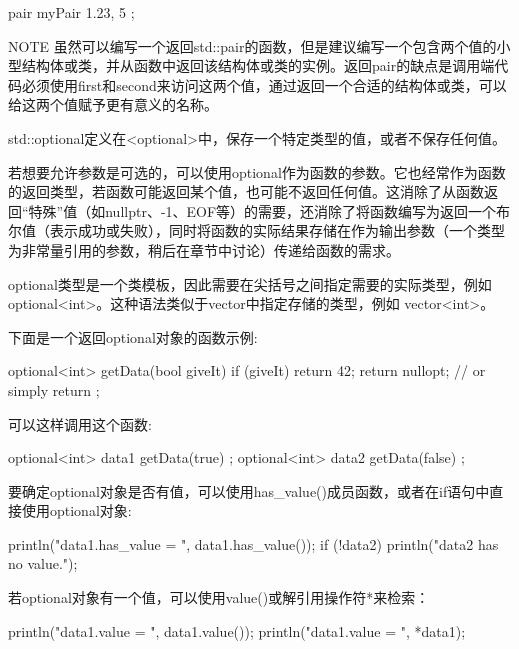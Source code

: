 \begin{cpp}
pair myPair { 1.23, 5 };
\end{cpp}

\begin{myNotic}{NOTE}
虽然可以编写一个返回std::pair的函数，但是建议编写一个包含两个值的小型结构体或类，并从函数中返回该结构体或类的实例。返回pair的缺点是调用端代码必须使用first和second来访问这两个值，通过返回一个合适的结构体或类，可以给这两个值赋予更有意义的名称。
\end{myNotic}


std::optional定义在<optional>中，保存一个特定类型的值，或者不保存任何值。

若想要允许参数是可选的，可以使用optional作为函数的参数。它也经常作为函数的返回类型，若函数可能返回某个值，也可能不返回任何值。这消除了从函数返回“特殊”值（如nullptr、-1、EOF等）的需要，还消除了将函数编写为返回一个布尔值（表示成功或失败），同时将函数的实际结果存储在作为输出参数（一个类型为非常量引用的参数，稍后在章节中讨论）传递给函数的需求。

optional类型是一个类模板，因此需要在尖括号之间指定需要的实际类型，例如 optional<int>。这种语法类似于vector中指定存储的类型，例如 vector<int>。

下面是一个返回optional对象的函数示例:

\begin{cpp}
optional<int> getData(bool giveIt)
{
    if (giveIt) {
        return 42;
    }
    return nullopt; // or simply return {};
}
\end{cpp}

可以这样调用这个函数:

\begin{cpp}
optional<int> data1 { getData(true) };
optional<int> data2 { getData(false) };
\end{cpp}

要确定optional对象是否有值，可以使用has\_value()成员函数，或者在if语句中直接使用optional对象:

\begin{cpp}
println("data1.has_value = {}", data1.has_value());
if (!data2) {
    println("data2 has no value.");
}
\end{cpp}

若optional对象有一个值，可以使用value()或解引用操作符*来检索：

\begin{cpp}
println("data1.value = {}", data1.value());
println("data1.value = {}", *data1);
\end{cpp}

